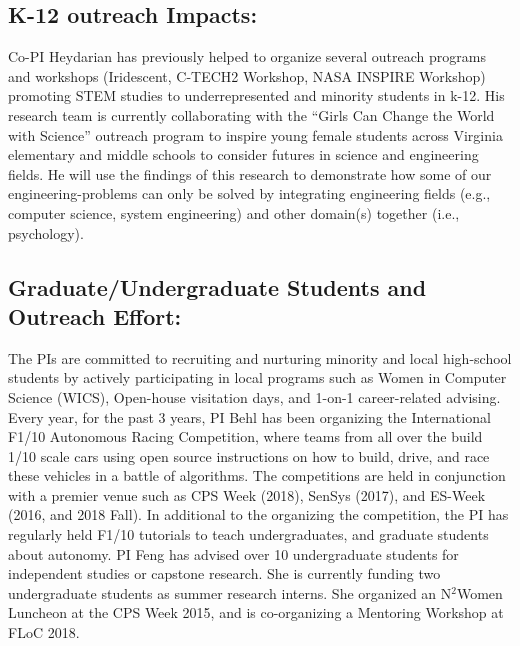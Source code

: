 \subsection{K-12 outreach Impacts:}
Co-PI Heydarian has previously helped to organize several outreach programs and workshops (Iridescent, C-TECH2 Workshop, NASA INSPIRE Workshop) promoting STEM studies to underrepresented and minority students in k-12. His research team is currently collaborating with the “Girls Can Change the World with Science” outreach program to inspire young female students across Virginia elementary and middle schools to consider futures in science and engineering fields. He will use the findings of this research to demonstrate how some of our engineering-problems can only be solved by integrating engineering fields (e.g., computer science, system engineering) and other domain(s) together (i.e., psychology). 



\subsection{Graduate/Undergraduate Students and Outreach Effort:}
The PIs are committed to recruiting and nurturing minority and local high-school students by actively participating in local programs such as Women in Computer Science (WICS),  Open-house visitation days, and 1-on-1 career-related advising.
Every year, for the past 3 years, PI Behl has been organizing the International F1/10 Autonomous Racing Competition, where teams from all over the build 1/10 scale cars using open source instructions on how to build, drive, and race these vehicles in a battle of algorithms. The competitions are held in conjunction with a premier venue such as CPS Week (2018), SenSys (2017), and ES-Week (2016, and 2018 Fall). In additional to the organizing the competition, the PI has regularly held F1/10 tutorials to teach undergraduates, and graduate students about autonomy. 
PI Feng has advised over 10 undergraduate students for independent studies or capstone research. She is currently funding two undergraduate students as summer research interns. She organized an N$^2$Women Luncheon at the CPS Week 2015, and is co-organizing a Mentoring Workshop at FLoC 2018.

